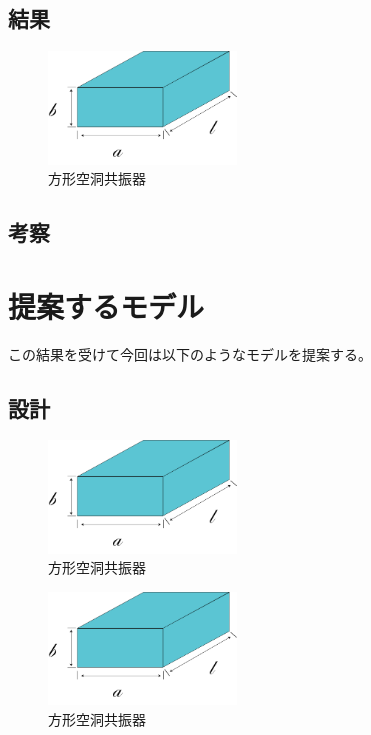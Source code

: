\subsection{結果}

\vspace{10 mm}

\begin{figure}[h]
  \begin{center}
    \includegraphics[width=5cm]{./image/空洞共振器.png}
    \caption{方形空洞共振器}
    \label{fig:Cavity}
  \end{center}
\end{figure}

\subsection{考察}


\section{提案するモデル}
この結果を受けて今回は以下のようなモデルを提案する。
\subsection{設計}
\vspace{10 mm}

\begin{figure}[h]
  \begin{center}
    \includegraphics[width=5cm]{./image/空洞共振器.png}
    \caption{方形空洞共振器}
    \label{fig:Cavity}
  \end{center}
\end{figure}

\vspace{10 mm}

\begin{figure}[h]
  \begin{center}
    \includegraphics[width=5cm]{./image/空洞共振器.png}
    \caption{方形空洞共振器}
    \label{fig:Cavity}
  \end{center}
\end{figure}

